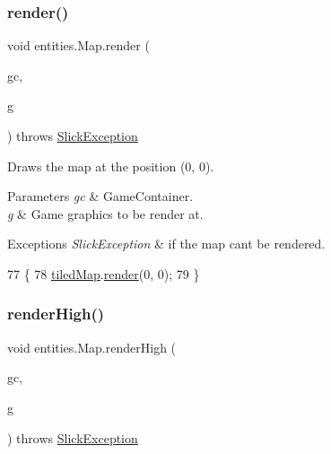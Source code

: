 \subsubsection{\texorpdfstring{render()}{render()}}
{\footnotesize\ttfamily void entities.\+Map.\+render (\begin{DoxyParamCaption}\item[{\mbox{\hyperlink{classorg_1_1newdawn_1_1slick_1_1_game_container}{Game\+Container}}}]{gc,  }\item[{\mbox{\hyperlink{classorg_1_1newdawn_1_1slick_1_1_graphics}{Graphics}}}]{g }\end{DoxyParamCaption}) throws \mbox{\hyperlink{classorg_1_1newdawn_1_1slick_1_1_slick_exception}{Slick\+Exception}}\hspace{0.3cm}{\ttfamily [inline]}}

Draws the map at the position (0, 0).


\begin{DoxyParams}{Parameters}
{\em gc} & Game\+Container. \\
\hline
{\em g} & Game graphics to be render at. \\
\hline
\end{DoxyParams}

\begin{DoxyExceptions}{Exceptions}
{\em Slick\+Exception} & if the map can\textquotesingle{}t be rendered. \\
\hline
\end{DoxyExceptions}

\begin{DoxyCode}
77                                                                            \{
78         \mbox{\hyperlink{classentities_1_1_map_a94a743ccd80946422fcbdb5ba1cc966b}{tiledMap}}.\mbox{\hyperlink{classorg_1_1newdawn_1_1slick_1_1tiled_1_1_tiled_map_a313dd901616b31c772f213675d236389}{render}}(0, 0);
79     \}
\end{DoxyCode}
\mbox{\label{classentities_1_1_map_a5089d63a94806cd3e9d2bdd0d31a799e}} 
\subsubsection{\texorpdfstring{render\+High()}{renderHigh()}}
{\footnotesize\ttfamily void entities.\+Map.\+render\+High (\begin{DoxyParamCaption}\item[{\mbox{\hyperlink{classorg_1_1newdawn_1_1slick_1_1_game_container}{Game\+Container}}}]{gc,  }\item[{\mbox{\hyperlink{classorg_1_1newdawn_1_1slick_1_1_graphics}{Graphics}}}]{g }\end{DoxyParamCaption}) throws \mbox{\hyperlink{classorg_1_1newdawn_1_1slick_1_1_slick_exception}{Slick\+Exception}}\hspace{0.3cm}{\ttfamily [inline]}}


